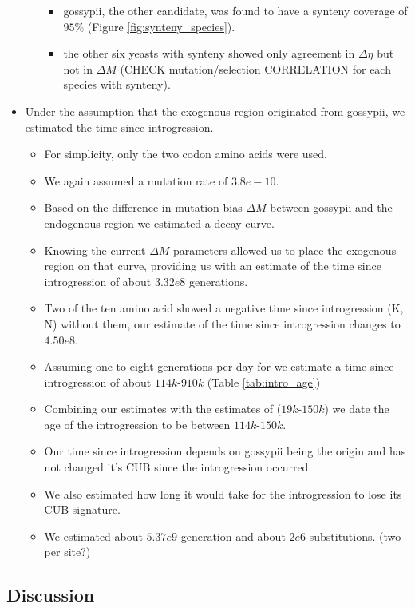 \documentclass[12pt]{article}
\begin{document}
\begin{itemize}
\begin{itemize}
\begin{itemize}
			\item gossypii, the other candidate, was found to have a synteny coverage of $95 \%$ (Figure \ref{fig:synteny_species}).
			\item the other six yeasts with synteny showed only agreement in $\Delta \eta$ but not in $\Delta M$ (CHECK mutation/selection CORRELATION for each species with synteny).
		\end{itemize}	 
	\end{itemize}
	\item Under the assumption that the exogenous region originated from gossypii, we estimated the time since introgression.
	\begin{itemize}
		\item For simplicity, only the two codon amino acids were used. 
		\item We again assumed a mutation rate of $3.8e-10$.
		\item Based on the difference in mutation bias $\Delta M$ between gossypii and the endogenous region we estimated a decay curve.
		\item Knowing the current $\Delta M$ parameters allowed us to place the exogenous region on that curve, providing us with an estimate of the time since introgression of about $3.32e8$ generations.
		\item Two of the ten amino acid showed a negative time since introgression (K, N) without them, our estimate of the time since introgression changes to $4.50e8$.
		\item Assuming one to eight generations per day for \kluyveri we estimate a time since introgression of about $114k$-$910k$ (Table \ref{tab:intro_age})
		\item Combining our estimates with the estimates of \citep{friedrich2015} ($19k$-$150k$) we date the age of the introgression to be between $114k$-$150k$.
		\item Our time since introgression depends on gossypii being the origin and has not changed it's CUB since the introgression occurred.
		\item We also estimated how long it would take for the introgression to lose its CUB signature.
		\item We estimated about $5.37e9$ generation and about $2e6$ substitutions. (two per site?)
	\end{itemize}
\end{itemize}


\subsection*{Discussion}
\end{document}
